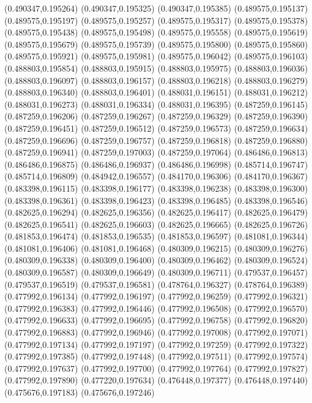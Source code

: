(0.490347,0.195264)
(0.490347,0.195325)
(0.490347,0.195385)
(0.489575,0.195137)
(0.489575,0.195197)
(0.489575,0.195257)
(0.489575,0.195317)
(0.489575,0.195378)
(0.489575,0.195438)
(0.489575,0.195498)
(0.489575,0.195558)
(0.489575,0.195619)
(0.489575,0.195679)
(0.489575,0.195739)
(0.489575,0.195800)
(0.489575,0.195860)
(0.489575,0.195921)
(0.489575,0.195981)
(0.489575,0.196042)
(0.489575,0.196103)
(0.488803,0.195854)
(0.488803,0.195915)
(0.488803,0.195975)
(0.488803,0.196036)
(0.488803,0.196097)
(0.488803,0.196157)
(0.488803,0.196218)
(0.488803,0.196279)
(0.488803,0.196340)
(0.488803,0.196401)
(0.488031,0.196151)
(0.488031,0.196212)
(0.488031,0.196273)
(0.488031,0.196334)
(0.488031,0.196395)
(0.487259,0.196145)
(0.487259,0.196206)
(0.487259,0.196267)
(0.487259,0.196329)
(0.487259,0.196390)
(0.487259,0.196451)
(0.487259,0.196512)
(0.487259,0.196573)
(0.487259,0.196634)
(0.487259,0.196696)
(0.487259,0.196757)
(0.487259,0.196818)
(0.487259,0.196880)
(0.487259,0.196941)
(0.487259,0.197003)
(0.487259,0.197064)
(0.486486,0.196813)
(0.486486,0.196875)
(0.486486,0.196937)
(0.486486,0.196998)
(0.485714,0.196747)
(0.485714,0.196809)
(0.484942,0.196557)
(0.484170,0.196306)
(0.484170,0.196367)
(0.483398,0.196115)
(0.483398,0.196177)
(0.483398,0.196238)
(0.483398,0.196300)
(0.483398,0.196361)
(0.483398,0.196423)
(0.483398,0.196485)
(0.483398,0.196546)
(0.482625,0.196294)
(0.482625,0.196356)
(0.482625,0.196417)
(0.482625,0.196479)
(0.482625,0.196541)
(0.482625,0.196603)
(0.482625,0.196665)
(0.482625,0.196726)
(0.481853,0.196474)
(0.481853,0.196535)
(0.481853,0.196597)
(0.481081,0.196344)
(0.481081,0.196406)
(0.481081,0.196468)
(0.480309,0.196215)
(0.480309,0.196276)
(0.480309,0.196338)
(0.480309,0.196400)
(0.480309,0.196462)
(0.480309,0.196524)
(0.480309,0.196587)
(0.480309,0.196649)
(0.480309,0.196711)
(0.479537,0.196457)
(0.479537,0.196519)
(0.479537,0.196581)
(0.478764,0.196327)
(0.478764,0.196389)
(0.477992,0.196134)
(0.477992,0.196197)
(0.477992,0.196259)
(0.477992,0.196321)
(0.477992,0.196383)
(0.477992,0.196446)
(0.477992,0.196508)
(0.477992,0.196570)
(0.477992,0.196633)
(0.477992,0.196695)
(0.477992,0.196758)
(0.477992,0.196820)
(0.477992,0.196883)
(0.477992,0.196946)
(0.477992,0.197008)
(0.477992,0.197071)
(0.477992,0.197134)
(0.477992,0.197197)
(0.477992,0.197259)
(0.477992,0.197322)
(0.477992,0.197385)
(0.477992,0.197448)
(0.477992,0.197511)
(0.477992,0.197574)
(0.477992,0.197637)
(0.477992,0.197700)
(0.477992,0.197764)
(0.477992,0.197827)
(0.477992,0.197890)
(0.477220,0.197634)
(0.476448,0.197377)
(0.476448,0.197440)
(0.475676,0.197183)
(0.475676,0.197246)
